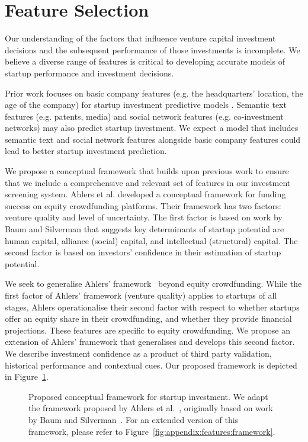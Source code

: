 \documentclass[../thesis/thesis.tex]{subfiles}
\begin{document}
\section{Feature Selection}

Our understanding of the factors that influence venture capital investment decisions and the subsequent performance of those investments is incomplete. We believe a diverse range of features is critical to developing accurate models of startup performance and investment decisions.

Prior work focuses on basic company features (e.g. the headquarters' location, the age of the company) for startup investment predictive models \cite{beckwith2016, gimmon2010}. Semantic text features (e.g. patents, media) \cite{hoenen2014, yuan2016} and social network features (e.g. co-investment networks) \cite{werth2013, cheng2016, yu2015} may also predict startup investment. We expect a model that includes semantic text and social network features alongside basic company features could lead to better startup investment prediction.

We propose a conceptual framework that builds upon previous work to ensure that we include a comprehensive and relevant set of features in our investment screening system.  Ahlers et al. \cite{ahlers2015} developed a conceptual framework for funding success on equity crowdfunding platforms. Their framework has two factors: venture quality and level of uncertainty. The first factor is based on work by Baum and Silverman \cite{baum2004} that suggests key determinants of startup potential are human capital, alliance (social) capital, and intellectual (structural) capital. The second factor is based on investors' confidence in their estimation of startup potential.

We seek to generalise Ahlers' framework~\cite{ahlers2015} beyond equity crowdfunding. While the first factor of Ahlers' framework (venture quality) applies to startups of all stages, Ahlers operationalise their second factor with respect to whether startups offer an equity share in their crowdfunding, and whether they provide financial projections. These features are specific to equity crowdfunding. We propose an extension of Ahlers' framework that generalises and develops this second factor. We describe investment confidence as a product of third party validation, historical performance and contextual cues. Our proposed framework is depicted in Figure~\ref{fig:litreview:theory:framework}.

\begin{figure}[!htb]
    \centering
    
    \caption{Proposed conceptual framework for startup investment. We adapt the framework proposed by Ahlers et al.~\cite{ahlers2015}, originally based on work by Baum and Silverman~\cite{baum2004}. For an extended version of this framework, please refer to Figure~\ref{fig:appendix:features:framework}.}
    \label{fig:litreview:theory:framework}
\end{figure}
\end{document}
